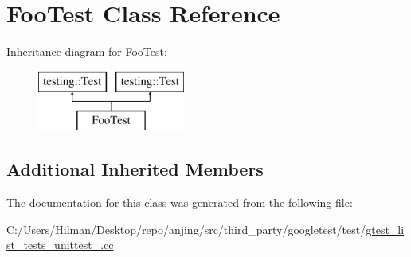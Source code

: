 \hypertarget{class_foo_test}{}\section{Foo\+Test Class Reference}
\label{class_foo_test}
Inheritance diagram for Foo\+Test\+:\begin{figure}[H]
\begin{center}
\leavevmode
\includegraphics[height=2.000000cm]{class_foo_test}
\end{center}
\end{figure}
\subsection*{Additional Inherited Members}


The documentation for this class was generated from the following file\+:\begin{DoxyCompactItemize}
\item 
C\+:/\+Users/\+Hilman/\+Desktop/repo/anjing/src/third\+\_\+party/googletest/test/\hyperlink{gtest__list__tests__unittest___8cc}{gtest\+\_\+list\+\_\+tests\+\_\+unittest\+\_\+.\+cc}\end{DoxyCompactItemize}
